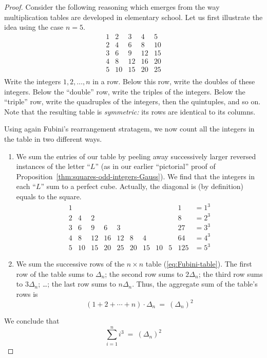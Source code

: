 \begin{proof}
%
Consider the following reasoning which emerges from the way
multiplication tables are developed in elementary school.  
Let us first illustrate the idea using the case $n=5$.
\begin{equation}
\label{eq:Fubini-table}
\begin{array}{rrrrr}
1  &  2 &  3 &  4 &  5 \\
2  &  4 &  6 &  8 & 10 \\
3  &  6 &  9 & 12 & 15 \\
4  &  8 & 12 & 16 & 20 \\
5  & 10 & 15 & 20 & 25 \\
\end{array}
\end{equation}
Write the integers $1, 2, \ldots, n$ in a row.  Below this row, write
the doubles of these integers.  Below the ``double'' row, write the
triples of the integers.  Below the ``triple'' row, write the
quadruples of the integers, then the quintuples, and so on.  Note that
the resulting table is {\em symmetric:} its rows are identical to its
columns.
\medskip

Using again Fubini's rearrangement stratagem, we now count all the integers in
the table in two different ways.
\begin{enumerate}
\item
We sum the entries of our table by peeling away successively larger
reversed instances of the letter ``$L$'' (as in our earlier
``pictorial'' proof of
Proposition~\ref{thm:squares-odd-integers-Gauss}).  We find that the
integers in each ``$L$'' sum to a perfect cube.
Actually, the diagonal is (by definition) equals to the square.
\[
\begin{array}{rrrrrrrrr|rrc}
1  &    &    &    &    &   &     &    &   & 1   & = 1^3 \\
2  &  4 &  2 &    &    &   &     &    &   & 8   & = 2^3 \\
3  &  6 &  9 &  6 &  3 &   &     &    &   & 27  & = 3^3 \\
4  &  8 & 12 & 16 & 12 &  8 &  4 &    &   & 64  & = 4^3 \\
5  & 10 & 15 & 20 & 25 & 20 & 15 & 10 & 5 & 125 & = 5^3
\end{array}
\]

\item
We sum the successive rows of the $n \times n$ table (\ref{eq:Fubini-table}).  
The first row of the table sums to $\Delta_n$; the second row sums to $2
\Delta_n$; the third row sums to $3 \Delta_n$; \ldots; the last row sums
to $n \Delta_n$.  
Thus, the aggregate sum of the table's rows is 
\[ (1 + 2 + \cdots + n) \cdot \Delta_n \ = \ \left(\Delta_n \right)^2 \]
\end{enumerate}
We conclude that
\[
\sum_{i=1}^n i^3 \ = \  \left(\Delta_n \right)^2
\]
\end{proof}


